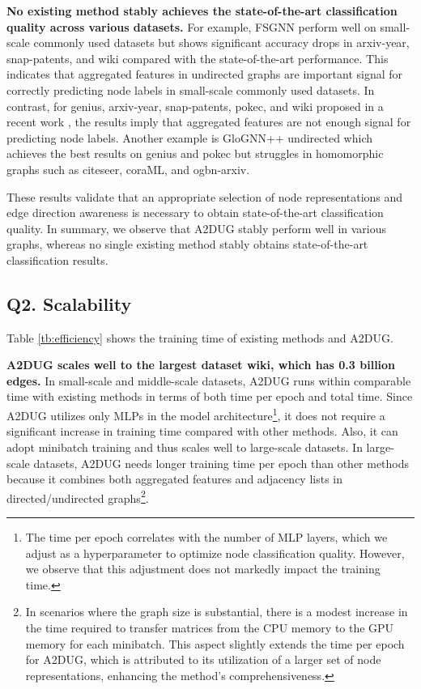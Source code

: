 \noindent\textbf{No existing method stably achieves the state-of-the-art classification quality across various datasets. }
For example, FSGNN perform well on small-scale commonly used datasets but shows significant accuracy drops in arxiv-year, snap-patents, and wiki compared with the state-of-the-art performance. This indicates that aggregated features in undirected graphs are important signal for correctly predicting node labels in small-scale commonly used datasets. 
In contrast, for genius, arxiv-year, snap-patents, pokec, and wiki proposed in a recent work \cite{lim2021large}, the results imply that aggregated features are not enough signal for predicting node labels. 
Another example is GloGNN++ undirected which achieves the best results on genius and pokec but struggles in homomorphic graphs such as citeseer, coraML, and ogbn-arxiv. 


These results validate that an appropriate selection of node representations and edge direction awareness is necessary to obtain state-of-the-art classification quality.
In summary, we observe that A2DUG stably perform well in various graphs, whereas no single existing method stably obtains state-of-the-art classification results. 



\subsection{Q2. Scalability}
\label{ssec:performance_A2DUG}
Table \ref{tb:efficiency} shows the training time of existing methods and \textsc{A2DUG}. 

\smallskip \noindent \textbf{A2DUG scales well to the largest dataset wiki, which has 0.3 billion edges. }
In small-scale and middle-scale datasets, A2DUG runs within comparable time with existing methods in terms of both time per epoch and total time. 
Since A2DUG utilizes only MLPs in the model architecture\footnote{The time per epoch correlates with the number of MLP layers, which we adjust as a hyperparameter to optimize node classification quality. However, we observe that this adjustment does not markedly impact the training time.}, it does not require a significant increase in training time compared with other methods. 
Also, it can adopt minibatch training and thus scales well to large-scale datasets. 
In large-scale datasets, \textsc{A2DUG} needs longer training time per epoch than other methods because it combines both aggregated features and adjacency lists in directed/undirected graphs\footnote{In scenarios where the graph size is substantial, there is a modest increase in the time required to transfer matrices from the CPU memory to the GPU memory for each minibatch. This aspect slightly extends the time per epoch for A2DUG, which is attributed to its utilization of a larger set of node representations, enhancing the method's comprehensiveness.}. 


